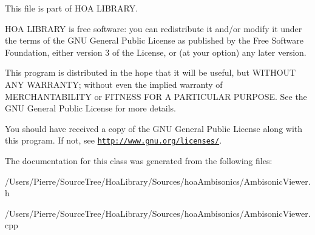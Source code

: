 This file is part of H\-O\-A L\-I\-B\-R\-A\-R\-Y.

H\-O\-A L\-I\-B\-R\-A\-R\-Y is free software\-: you can redistribute it and/or modify it under the terms of the G\-N\-U General Public License as published by the Free Software Foundation, either version 3 of the License, or (at your option) any later version.

This program is distributed in the hope that it will be useful, but W\-I\-T\-H\-O\-U\-T A\-N\-Y W\-A\-R\-R\-A\-N\-T\-Y; without even the implied warranty of M\-E\-R\-C\-H\-A\-N\-T\-A\-B\-I\-L\-I\-T\-Y or F\-I\-T\-N\-E\-S\-S F\-O\-R A P\-A\-R\-T\-I\-C\-U\-L\-A\-R P\-U\-R\-P\-O\-S\-E. See the G\-N\-U General Public License for more details.

You should have received a copy of the G\-N\-U General Public License along with this program. If not, see \href{http://www.gnu.org/licenses/}{\tt http\-://www.\-gnu.\-org/licenses/}. 

The documentation for this class was generated from the following files\-:\begin{DoxyCompactItemize}
\item 
/\-Users/\-Pierre/\-Source\-Tree/\-Hoa\-Library/\-Sources/hoa\-Ambisonics/Ambisonic\-Viewer.\-h\item 
/\-Users/\-Pierre/\-Source\-Tree/\-Hoa\-Library/\-Sources/hoa\-Ambisonics/Ambisonic\-Viewer.\-cpp\end{DoxyCompactItemize}
